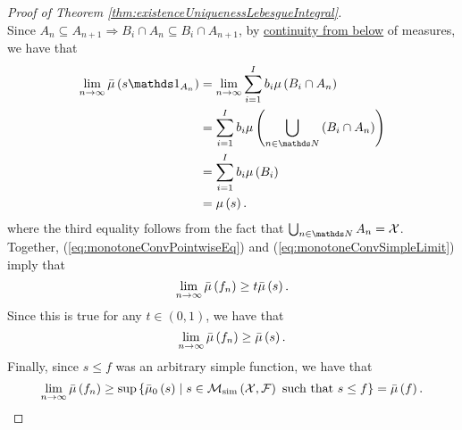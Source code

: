 \begin{proof}[Proof of Theorem \ref{thm:existenceUniquenessLebesgueIntegral}]
\[\]
Since $A_{n}\subseteq A_{n+1}\Longrightarrow B_{i}\cap A_{n}\subseteq B_{i}\cap A_{n+1}$,
by \hyperref[prop:measureProperties]{continuity from below} of measures,
we have that 
\begin{align}
\lim_{n\to\infty}\lebInt{\mu}{s\indicate_{A_{n}}} & =\lim_{n\to\infty}\sum_{i=1}^{I}b_{i}\mu\left(B_{i}\cap A_{n}\right)\nonumber \\
 & =\sum_{i=1}^{I}b_{i}\mu\left(\bigcup_{n\in\N}\left(B_{i}\cap A_{n}\right)\right)\nonumber \\
 & =\sum_{i=1}^{I}b_{i}\mu\left(B_{i}\right)\nonumber \\
 & =\mu\left(s\right).\label{eq:monotoneConvSimpleLimit}
\end{align}
where the third equality follows from the fact that $\bigcup_{n\in\N}A_{n}=\X$.
Together, (\ref{eq:monotoneConvPointwiseEq}) and (\ref{eq:monotoneConvSimpleLimit})
imply that 
\[
\lim_{n\to\infty}\bar{\mu}\left(f_{n}\right)\geq t\bar{\mu}\left(s\right).
\]
Since this is true for any $t\in\left(0,1\right)$, we have that 
\[
\lim_{n\to\infty}\bar{\mu}\left(f_{n}\right)\geq\bar{\mu}\left(s\right).
\]
Finally, since $s\leq f$ was an arbitrary simple function, we have
that 
\[
\lim_{n\to\infty}\bar{\mu}\left(f_{n}\right)\geq\sup\left\{ \bar{\mu}_{0}\left(s\right)\mid s\in\mathcal{M}_{\textnormal{sim}}\left(\mathcal{X},\mathcal{F}\right)\textnormal{ such that }s\leq f\right\} =\bar{\mu}\left(f\right).
\]


\end{proof}
